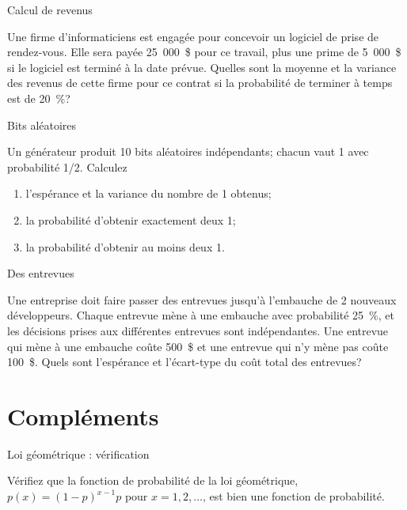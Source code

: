 \documentclass{BeamerTemplate}
\newcommand{\cibleReponse}{}
\newcommand{\lienreponse}[1]{\gdef\cibleReponse{#1}}
\begin{document}
\begin{frame}[t,label=exrevenus]{Calcul de revenus}

{\small
Une firme d'informaticiens est engagée pour concevoir un logiciel de prise de rendez-vous. Elle sera payée 25~000~\$ pour ce travail, plus une prime de 5~000~\$ si le logiciel est terminé à la date prévue. Quelles sont la moyenne et la variance des revenus de cette firme pour ce contrat si la probabilité de terminer à temps est de 20~\%?
}
\lienreponse{rep-ex}
\end{frame}

\begin{frame}[t,label=exbits]{Bits aléatoires}

{\small
Un générateur produit 10 bits aléatoires indépendants; chacun vaut 1 avec probabilité 1/2. Calculez
\begin{enumerate}
 \item[(i)] l'espérance et la variance du nombre de 1 obtenus;
 \item[(ii)] la probabilité d'obtenir exactement deux 1;
 \item[(iii)] la probabilité d'obtenir au moins deux 1.
\end{enumerate}
}
\lienreponse{rep-ex}
\end{frame}


\begin{frame}[t,label=exentrevues]{Des entrevues}

{\small
 Une entreprise doit faire passer des entrevues jusqu'à l'embauche de
 2 nouveaux développeurs. Chaque entrevue mène à une embauche avec probabilité 25~\%,
 et les décisions prises aux différentes entrevues sont indépendantes. Une entrevue
 qui mène à une embauche coûte 500~\$ et une entrevue qui n'y mène pas coûte 100~\$.
 Quels sont l'espérance et l'écart-type du coût total des entrevues?
}
\lienreponse{rep-ex}
\end{frame}

\section{Compléments}

\begin{frame}{Loi géométrique : vérification}

Vérifiez que la fonction de probabilité de la loi géométrique,
$p(x)=(1-p)^{x-1}p$ pour $x=1,2,\ldots$, est bien une fonction de probabilité.
\vspace{5cm}

\end{frame}
\end{document}
